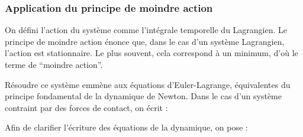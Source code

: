 			\subsubsection{Application du principe de moindre action}	
			
				
					On défini l'action du système comme l'intégrale temporelle du Lagrangien. 
					Le principe de moindre action énonce que, dans le cas d'un système Lagrangien, l'action est stationnaire. Le plus souvent, cela correspond à un minimum, d'où le terme de ``moindre action''.
					
					Résoudre ce système emmène aux équations d'Euler-Lagrange, équivalentes du principe fondamental de la dynamique de Newton. 
					Dans le cas d'un système contraint par des forces de contact, on écrit :
					
					Afin de clarifier l'écriture des équations de la dynamique, on pose :
				
				
